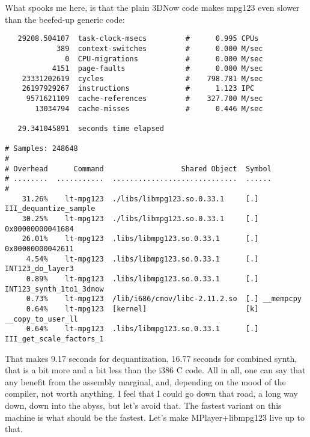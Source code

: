 \documentclass[a4paper,12pt]{scrartcl}
\begin{document}
What spooks me here, is that the plain 3DNow code makes mpg123 even slower than the beefed-up generic code:
\begin{verbatim}
   29208.504107  task-clock-msecs         #      0.995 CPUs 
            389  context-switches         #      0.000 M/sec
              0  CPU-migrations           #      0.000 M/sec
           4151  page-faults              #      0.000 M/sec
    23331202619  cycles                   #    798.781 M/sec
    26197929267  instructions             #      1.123 IPC  
     9571621109  cache-references         #    327.700 M/sec
       13034794  cache-misses             #      0.446 M/sec

   29.341045891  seconds time elapsed

# Samples: 248648
#
# Overhead      Command                  Shared Object  Symbol
# ........  ...........  .............................  ......
#
    31.26%    lt-mpg123  ./libs/libmpg123.so.0.33.1     [.] III_dequantize_sample
    30.25%    lt-mpg123  ./libs/libmpg123.so.0.33.1     [.] 0x00000000041684
    26.01%    lt-mpg123  .libs/libmpg123.so.0.33.1      [.] 0x00000000042611
     4.54%    lt-mpg123  .libs/libmpg123.so.0.33.1      [.] INT123_do_layer3
     0.89%    lt-mpg123  .libs/libmpg123.so.0.33.1      [.] INT123_synth_1to1_3dnow
     0.73%    lt-mpg123  /lib/i686/cmov/libc-2.11.2.so  [.] __mempcpy
     0.64%    lt-mpg123  [kernel]                       [k] __copy_to_user_ll
     0.64%    lt-mpg123  .libs/libmpg123.so.0.33.1      [.] III_get_scale_factors_1
\end{verbatim}
That makes 9.17 seconds for dequantization, 16.77 seconds for combined synth, that is a bit more and a bit less than the i386 C code.
All in all, one can say that any benefit from the assembly marginal, and, depending on the mood of the compiler, not worth anything. I feel that I could go down that road, a long way down, down into the abyss, but let's avoid that.
The fastest variant on this machine is what should be the fastest. Let's make MPlayer+libmpg123 live up to that.
\end{document}

